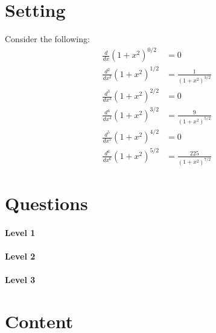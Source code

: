 \documentclass{ximera}
\begin{document}
\section{Setting}

Consider the following:
\begin{align*}
  \frac{d}{dx} \left(1+x^2\right)^{0/2} &=0\\
  \frac{d^2}{dx^2} \left(1+x^2\right)^{1/2} &= \frac{1}{\left(1+x^2\right)^{3/2}}\\
  \frac{d^3}{dx^3} \left(1+x^2\right)^{2/2} &= 0\\
  \frac{d^4}{dx^4} \left(1+x^2\right)^{3/2} &= \frac{9}{\left(1+x^2\right)^{5/2}}\\
  \frac{d^5}{dx^5} \left(1+x^2\right)^{4/2} &= 0\\
  \frac{d^6}{dx^6} \left(1+x^2\right)^{5/2} &= \frac{225}{\left(1+x^2\right)^{7/2}}
\end{align*}


\section{Questions}

\paragraph{Level 1}

\paragraph{Level 2}

\paragraph{Level 3}


\section{Content}
\end{document}
